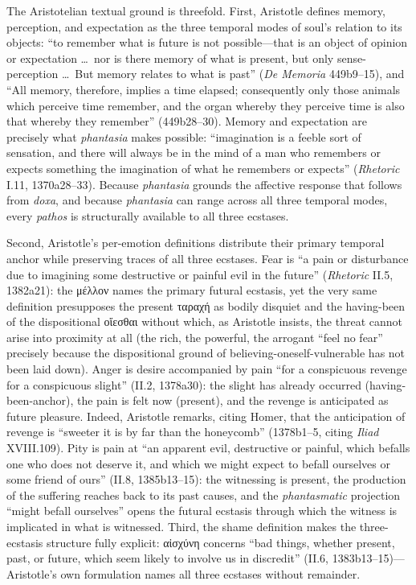 \documentclass{article}
\newcommand{\gk}[1]{{\greekfont #1}}
\begin{document}
The Aristotelian textual ground is threefold. First, Aristotle defines memory, perception, and expectation as the three temporal modes of soul's relation to its objects: ``to remember what is future is not possible---that is an object of opinion or expectation \ldots\ nor is there memory of what is present, but only sense-perception \ldots\ But memory relates to what is past'' (\textit{De Memoria} 449b9--15), and ``All memory, therefore, implies a time elapsed; consequently only those animals which perceive time remember, and the organ whereby they perceive time is also that whereby they remember'' (449b28--30). Memory and expectation are precisely what \textit{phantasia} makes possible: ``imagination is a feeble sort of sensation, and there will always be in the mind of a man who remembers or expects something the imagination of what he remembers or expects'' (\textit{Rhetoric} I.11, 1370a28--33). Because \textit{phantasia} grounds the affective response that follows from \textit{doxa}, and because \textit{phantasia} can range across all three temporal modes, every \textit{pathos} is structurally available to all three ecstases.

Second, Aristotle's per-emotion definitions distribute their primary temporal anchor while preserving traces of all three ecstases. Fear is ``a pain or disturbance due to imagining some destructive or painful evil in the future'' (\textit{Rhetoric} II.5, 1382a21): the \gk{μέλλον} names the primary futural ecstasis, yet the very same definition presupposes the present \gk{ταραχή} as bodily disquiet and the having-been of the dispositional \gk{οἴεσθαι} without which, as Aristotle insists, the threat cannot arise into proximity at all (the rich, the powerful, the arrogant ``feel no fear'' precisely because the dispositional ground of believing-oneself-vulnerable has not been laid down). Anger is desire accompanied by pain ``for a conspicuous revenge for a conspicuous slight'' (II.2, 1378a30): the slight has already occurred (having-been-anchor), the pain is felt now (present), and the revenge is anticipated as future pleasure. Indeed, Aristotle remarks, citing Homer, that the anticipation of revenge is ``sweeter it is by far than the honeycomb'' (1378b1--5, citing \textit{Iliad} XVIII.109). Pity is pain at ``an apparent evil, destructive or painful, which befalls one who does not deserve it, and which we might expect to befall ourselves or some friend of ours'' (II.8, 1385b13--15): the witnessing is present, the production of the suffering reaches back to its past causes, and the \textit{phantasmatic} projection ``might befall ourselves'' opens the futural ecstasis through which the witness is implicated in what is witnessed. Third, the shame definition makes the three-ecstasis structure fully explicit: \gk{αἰσχύνη} concerns ``bad things, whether present, past, or future, which seem likely to involve us in discredit'' (II.6, 1383b13--15)---Aristotle's own formulation names all three ecstases without remainder.
\end{document}
